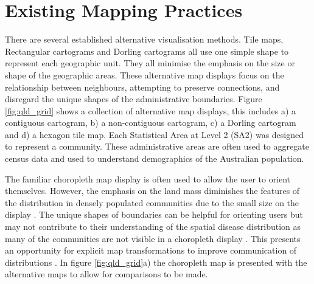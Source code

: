 \documentclass{monashthesis}
\begin{document}
\hypertarget{existing-mapping-practices}{%
\section{Existing Mapping Practices}\label{existing-mapping-practices}}

There are several established alternative visualisation methods.
Tile maps, Rectangular cartograms \autocite{ORC} and Dorling cartograms \autocite{ACTUC} all use one simple shape to represent each geographic unit. They all minimise the emphasis on the size or shape of the geographic areas. These alternative map displays focus on the relationship between neighbours, attempting to preserve connections, and disregard the unique shapes of the administrative boundaries. Figure \ref{fig:qld_grid} shows a collection of alternative map displays, this includes a) a contiguous cartogram, b) a non-contiguous cartogram, c) a Dorling cartogram and d) a hexagon tile map.
Each Statistical Area at Level 2 (SA2) \autocite{abs2016} was designed to represent a community. These administrative areas are often used to aggregate census data and used to understand demographics of the Australian population.

The familiar choropleth map display is often used to allow the user to orient themselves. However, the emphasis on the land mass diminishes the features of the distribution in densely populated communities due to the small size on the display \autocite{ACTUC}.
The unique shapes of boundaries can be helpful for orienting users but may not contribute to their understanding of the spatial disease distribution as many of the communities are not visible in a choropleth display \autocite{TVSSS}. This presents an opportunity for explicit map transformations to improve communication of distributions \autocite{CBATCC}. In figure \ref{fig:qld_grid}a) the choropleth map is presented with the alternative maps to allow for comparisons to be made.
\end{document}
